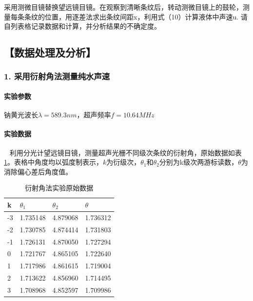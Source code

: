 \documentclass[12pt,a4paper,UTF8]{ctexart}
\begin{document}
采用测微目镜替换望远镜目镜。在观察到清晰条纹后，转动测微目镜上的鼓轮，测量每条条纹的位置，用逐差法求出条纹间距x，利用式（10）计算液体中声速u.
请自列表格记录数据和计算，并分析结果的不确定度。

\subsection*{【数据处理及分析】}
	\subsubsection*{1. 采用衍射角法测量纯水声速}
		\paragraph{实验参数} 钠黄光波长$\lambda = 589.3 nm$，超声频率$f = 10.64 MHz$
		\paragraph{实验数据}~
		\newline
		\indent
		利用分光计望远镜目镜，测量超声光栅不同级次条纹的衍射角，原始数据如表\ref{tab:1}。表格中角度均以弧度制表示，$k$为衍级次，$\theta_1$和$\theta_2$分别为k级次两游标读数，$\theta$为消除偏心差后角度值。
		\begin{table}[htbp]
			\centering
			\begin{tabular}{|l|l|l|l|}
			\hline
				k & $\theta_1$ & $\theta_2$ & $\theta$ \\ \hline
				-3 & 1.735148 & 4.879068 & 1.736312 \\ \hline
				-2 & 1.730785 & 4.874414 & 1.731803 \\ \hline
				-1 & 1.726131 & 4.870050 & 1.727294 \\ \hline
				0 & 1.721767 & 4.865105 & 1.722640 \\ \hline
				1 & 1.717986 & 4.861615 & 1.719004 \\ \hline
				2 & 1.713622 & 4.856960 & 1.714495 \\ \hline
				3 & 1.708968 & 4.852597 & 1.709986 \\ \hline
			\end{tabular}
			\caption{衍射角法实验原始数据}
			\label{tab:1}
		\end{table}
\end{document}

